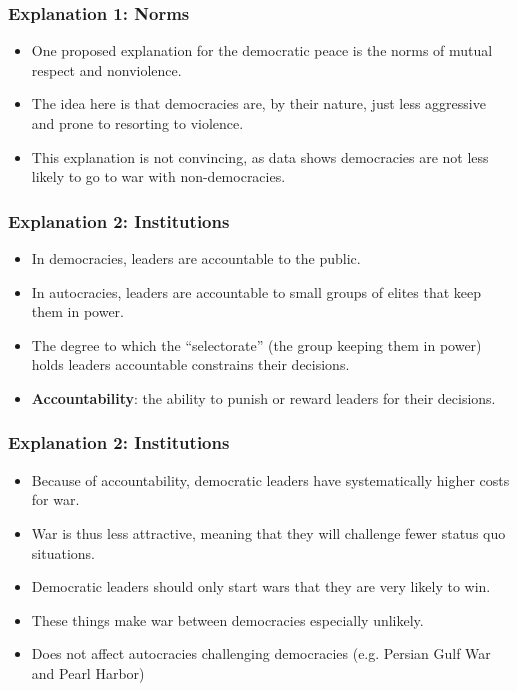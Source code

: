 \documentclass{beamer}
\begin{document}
\begin{frame} 
	\frametitle{\LARGE{Explanation 1: Norms}}
	\begin{itemize}
		\item One proposed explanation for the democratic peace is the norms of mutual respect and nonviolence. \pause 
		\item The idea here is that democracies are, by their nature, just less aggressive and prone to resorting to violence. \pause
		\item This explanation is not convincing, as data shows democracies are not less likely to go to war with non-democracies.
	\end{itemize}
\end{frame}

\begin{frame} 
\frametitle{\LARGE{Explanation 2: Institutions}}
\begin{itemize}
		\item In democracies, leaders are accountable to the public. \pause
		\item In autocracies, leaders are accountable to small groups of elites that keep them in power. \pause
		\item The degree to which the ``selectorate'' (the group keeping them in power) holds leaders accountable constrains their decisions. \pause
		\item \textbf{Accountability}: the ability to punish or reward leaders for their decisions.

\end{itemize}
\end{frame}


\begin{frame} 
\frametitle{\LARGE{Explanation 2: Institutions}}
\begin{itemize}
		\item Because of accountability, democratic leaders have systematically higher costs for war. \pause 
		\item War is thus less attractive, meaning that they will challenge fewer status quo situations. \pause
		\item Democratic leaders should only start wars that they are very likely to win. \pause 
		\item These things make war between democracies especially unlikely. \pause 
		\item Does not affect autocracies challenging democracies (e.g. Persian Gulf War and Pearl Harbor)
\end{itemize}
\end{frame}
\end{document}
